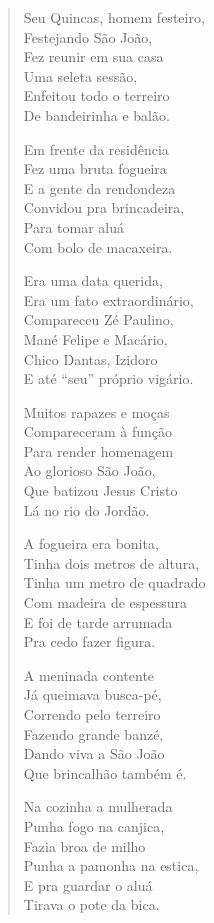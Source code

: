 \begin{verse}
Seu Quincas, homem festeiro, \\
Festejando São João,\\
Fez reunir em sua casa\\
Uma seleta sessão,\\
Enfeitou todo o terreiro\\
De bandeirinha e balão.

Em frente da residência\\
Fez uma bruta fogueira\\
E a gente da rendondeza\\
Convidou pra brincadeira,\\
Para tomar aluá\\
Com bolo de macaxeira.

Era uma data querida,\\
Era um fato extraordinário,\\
Compareceu Zé Paulino,\\
Mané Felipe e Macário, \\
Chico Dantas, Izidoro\\
E até “seu” próprio vigário.
\pagebreak

Muitos rapazes e moças\\
Compareceram à função\\
Para render homenagem\\
Ao glorioso São João,\\
Que batizou Jesus Cristo\\
Lá no rio do Jordão.

A fogueira era bonita,\\
Tinha dois metros de altura,\\
Tinha um metro de quadrado\\
Com madeira de espessura\\
E foi de tarde arrumada\\
Pra cedo fazer figura.

A meninada contente\\
Já queimava busca-pé,\\
Correndo pelo terreiro\\
Fazendo grande banzé,\\
Dando viva a São João\\
Que brincalhão também é.

Na cozinha a mulherada\\
Punha fogo na canjica,\\
Fazia broa de milho\\
Punha a pamonha na estica,\\
E pra guardar o aluá\\
Tirava o pote da bica.
\pagebreak


\end{verse}
